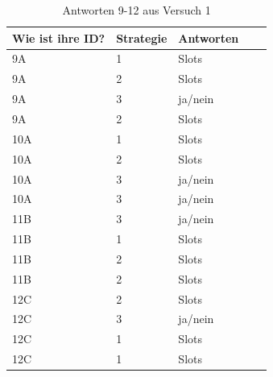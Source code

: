 \documentclass[12pt,a4paper]{scrartcl}
\begin{document}
\begin{appendix}
\begin{table}
\centering
\caption{Antworten 9-12 aus Versuch 1}
\begin{tabular}{ | l | l | l | l | l | }
\hline
Wie ist ihre ID? & Strategie & Antworten \\ \hline \hline
	9A & 1 & Slots \\ \hline
	9A & 2 & Slots \\ \hline
	9A & 3 & ja/nein \\ \hline
	9A & 2 & Slots \\ \hline \hline
	10A & 1 & Slots \\ \hline
	10A & 2 & Slots \\ \hline
	10A & 3 & ja/nein \\ \hline
	10A & 3 & ja/nein \\ \hline \hline
	11B & 3 & ja/nein \\ \hline
	11B & 1 & Slots \\ \hline
	11B & 2 & Slots \\ \hline
	11B & 2 & Slots \\ \hline \hline
	12C & 2 & Slots \\ \hline
	12C & 3 & ja/nein \\ \hline
	12C & 1 & Slots \\ \hline
	12C & 1 & Slots \\ \hline

\end{tabular}
\end{table}



\end{appendix}
\end{document}
